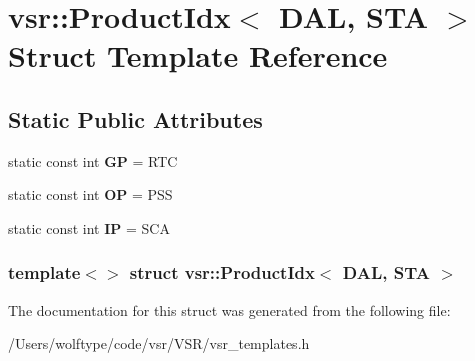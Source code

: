 \hypertarget{structvsr_1_1_product_idx_3_01_d_a_l_00_01_s_t_a_01_4}{\section{vsr\-:\-:Product\-Idx$<$ D\-A\-L, S\-T\-A $>$ Struct Template Reference}
\label{structvsr_1_1_product_idx_3_01_d_a_l_00_01_s_t_a_01_4}
}
\subsection*{Static Public Attributes}
\begin{DoxyCompactItemize}
\item 
\hypertarget{structvsr_1_1_product_idx_3_01_d_a_l_00_01_s_t_a_01_4_a6936228fa298d281e1ad6f6e0e68b284}{static const int {\bfseries G\-P} = R\-T\-C}\label{structvsr_1_1_product_idx_3_01_d_a_l_00_01_s_t_a_01_4_a6936228fa298d281e1ad6f6e0e68b284}

\item 
\hypertarget{structvsr_1_1_product_idx_3_01_d_a_l_00_01_s_t_a_01_4_ab4630b8c44464051a599238c6d1e2963}{static const int {\bfseries O\-P} = P\-S\-S}\label{structvsr_1_1_product_idx_3_01_d_a_l_00_01_s_t_a_01_4_ab4630b8c44464051a599238c6d1e2963}

\item 
\hypertarget{structvsr_1_1_product_idx_3_01_d_a_l_00_01_s_t_a_01_4_a42a1e325c5baf93315b9afe204c18ec7}{static const int {\bfseries I\-P} = S\-C\-A}\label{structvsr_1_1_product_idx_3_01_d_a_l_00_01_s_t_a_01_4_a42a1e325c5baf93315b9afe204c18ec7}

\end{DoxyCompactItemize}
\subsubsection*{template$<$$>$ struct vsr\-::\-Product\-Idx$<$ D\-A\-L, S\-T\-A $>$}



The documentation for this struct was generated from the following file\-:\begin{DoxyCompactItemize}
\item 
/\-Users/wolftype/code/vsr/\-V\-S\-R/vsr\-\_\-templates.\-h\end{DoxyCompactItemize}
